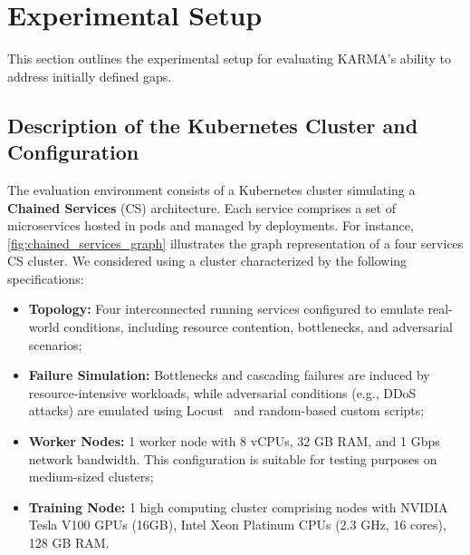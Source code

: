 \section{Experimental Setup}
\label{sec:experiments}

This section outlines the experimental setup for evaluating KARMA's ability to address initially defined gaps.

\subsection{Description of the Kubernetes Cluster and Configuration}

The evaluation environment consists of a Kubernetes cluster simulating a \textbf{Chained Services} (CS) architecture. Each service comprises a set of microservices hosted in pods and managed by deployments. For instance, \autoref{fig:chained_services_graph} illustrates the graph representation of a four services CS cluster. We considered using a cluster characterized by the following specifications:

\begin{itemize}
  \item \textbf{Topology:} Four interconnected running services configured to emulate real-world conditions, including resource contention, bottlenecks, and adversarial scenarios;
  \item \textbf{Failure Simulation:} Bottlenecks and cascading failures are induced by resource-intensive workloads, while adversarial conditions (e.g., DDoS attacks) are emulated using Locust~\cite{locust2021} and random-based custom scripts;
  \item \textbf{Worker Nodes:} 1 worker node with 8 vCPUs, 32 GB RAM, and 1 Gbps network bandwidth. This configuration is suitable for testing purposes on medium-sized clusters;
  \item \textbf{Training Node:} 1 high computing cluster comprising nodes with NVIDIA Tesla V100 GPUs (16GB), Intel Xeon Platinum CPUs (2.3 GHz, 16 cores), 128 GB RAM.
\end{itemize}

